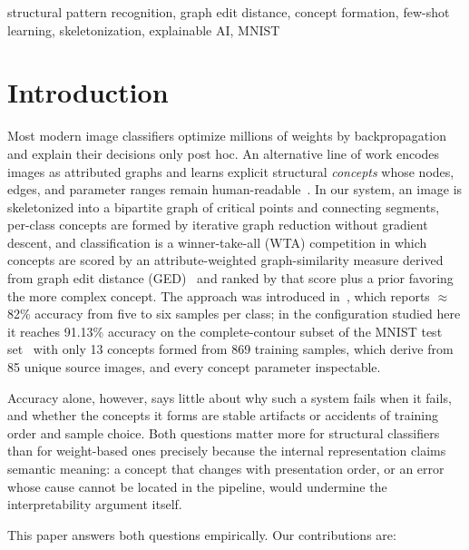 \documentclass[conference]{IEEEtran}
\begin{document}
\begin{IEEEkeywords}
structural pattern recognition, graph edit distance, concept formation,
few-shot learning, skeletonization, explainable AI, MNIST
\end{IEEEkeywords}

\section{Introduction}

Most modern image classifiers optimize millions of weights by
backpropagation and explain their decisions only post hoc. An alternative
line of work encodes images as attributed graphs and learns explicit
structural \emph{concepts} whose nodes, edges, and parameter ranges remain
human-readable~\cite{parzhyn2013principles,parzhyn2025architecture,lapin2025fewshot}.
In our system, an image is skeletonized into a bipartite graph of critical
points and connecting segments, per-class concepts are formed by iterative
graph reduction without gradient descent, and classification is a
winner-take-all (WTA) competition in which concepts are scored by an
attribute-weighted graph-similarity measure derived from graph edit
distance (GED)~\cite{bunke1983inexact,riesen2009approx} and ranked by that
score plus a prior favoring the more complex concept. The approach was
introduced in~\cite{lapin2025fewshot}, which reports $\approx$82\%
accuracy from five to six samples per class; in the
configuration studied here it reaches 91.13\% accuracy on the
complete-contour subset of the MNIST test
set~\cite{lecun1998gradient} with only 13 concepts formed from 869
training samples, which derive from 85 unique source images, and every
concept parameter inspectable.

Accuracy alone, however, says little about why such a system fails
when it fails, and whether the concepts it forms are stable artifacts or
accidents of training order and sample choice. Both questions matter more
for structural classifiers than for weight-based ones precisely because
the internal representation claims semantic meaning: a concept that
changes with presentation order, or an error whose cause cannot be located
in the pipeline, would undermine the interpretability argument itself.

This paper answers both questions empirically. Our contributions are:
\end{document}
